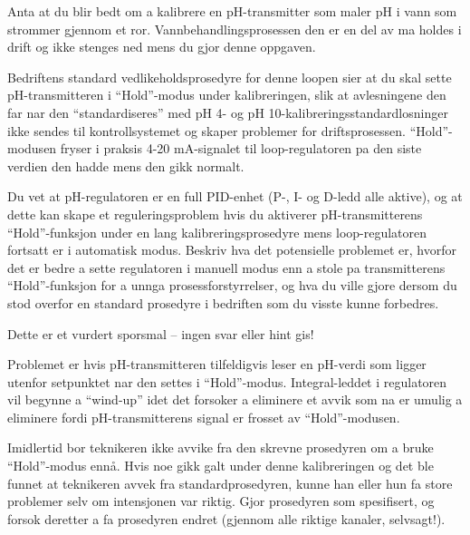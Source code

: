 

Anta at du blir bedt om a kalibrere en pH-transmitter som maler pH i vann som strommer gjennom et ror.  Vannbehandlingsprosessen den er en del av ma holdes i drift og ikke stenges ned mens du gjor denne oppgaven.  

Bedriftens standard vedlikeholdsprosedyre for denne loopen sier at du skal sette pH-transmitteren i ``Hold''-modus under kalibreringen, slik at avlesningene den far nar den ``standardiseres'' med pH 4- og pH 10-kalibreringsstandardlosninger ikke sendes til kontrollsystemet og skaper problemer for driftsprosessen.  ``Hold''-modusen fryser i praksis 4-20 mA-signalet til loop-regulatoren pa den siste verdien den hadde mens den gikk normalt.

\vskip 10pt

Du vet at pH-regulatoren er en full PID-enhet (P-, I- og D-ledd alle aktive), og at dette kan skape et reguleringsproblem hvis du aktiverer pH-transmitterens ``Hold''-funksjon under en lang kalibreringsprosedyre mens loop-regulatoren fortsatt er i automatisk modus.  Beskriv hva det potensielle problemet er, hvorfor det er bedre a sette regulatoren i manuell modus enn a stole pa transmitterens ``Hold''-funksjon for a unnga prosessforstyrrelser, og hva du ville gjore dersom du stod overfor en standard prosedyre i bedriften som du visste kunne forbedres.

\vfil

\eject






Dette er et vurdert sporsmal -- ingen svar eller hint gis!







Problemet er hvis pH-transmitteren tilfeldigvis leser en pH-verdi som ligger utenfor setpunktet nar den settes i ``Hold''-modus.  Integral-leddet i regulatoren vil begynne a ``wind-up'' idet det forsoker a eliminere et avvik som na er umulig a eliminere fordi pH-transmitterens signal er frosset av ``Hold''-modusen.

Imidlertid bor teknikeren ikke avvike fra den skrevne prosedyren om a bruke ``Hold''-modus ennå.  Hvis noe gikk galt under denne kalibreringen og det ble funnet at teknikeren avvek fra standardprosedyren, kunne han eller hun fa store problemer selv om intensjonen var riktig.  Gjor prosedyren som spesifisert, og forsok deretter a fa prosedyren endret (gjennom alle riktige kanaler, selvsagt!).




